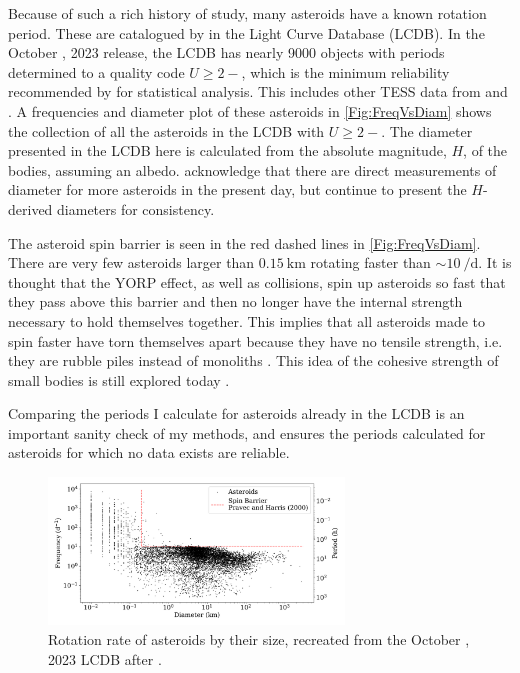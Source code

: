 \documentclass{UCreport}
\begin{document}
Because of such a rich history of study, many asteroids have a known rotation period.
These are catalogued by \citet{Warner2009} in the Light Curve Database (LCDB).
In the October , 2023 release, the LCDB has nearly 9000 objects with periods determined to a quality code $U\geq 2-$, which is the minimum reliability recommended by \citeauthor{Warner2009} for statistical analysis.
This includes other TESS data from \citet{Pal2020} and \citet{Woods2021}.
A frequencies and diameter plot of these asteroids in \autoref{Fig:FreqVsDiam} shows the collection of all the asteroids in the LCDB with $U\geq 2-$.
The diameter presented in the LCDB here is calculated from the absolute magnitude, $H$, of the bodies, assuming an albedo.
\citeauthor{Warner2009} acknowledge that there are direct measurements of diameter for more asteroids in the present day, but continue to present the $H$-derived diameters for consistency.

The asteroid spin barrier \citep{Pravec2000} is seen in the red dashed lines in \autoref{Fig:FreqVsDiam}.
There are very few asteroids larger than $\qty{0.15}{\kilo\metre}$ rotating faster than $\sim \qty{10}{\per\day}$.
It is thought that the YORP effect, as well as collisions, spin up asteroids so fast that they pass above this barrier and then no longer have the internal strength necessary to hold themselves together.
This implies that all asteroids made to spin faster have torn themselves apart because they have no tensile strength, i.e. they are rubble piles instead of monoliths \citep{Harris1996}.
This idea of the cohesive strength of small bodies is still explored today \citep[e.g.][for V-type asteroids]{Oszkiewicz2020}.

Comparing the periods I calculate for asteroids already in the LCDB is an important sanity check of my methods, and ensures the periods calculated for asteroids for which no data exists are reliable.

\begin{figure}[h]
  \centering
  \includegraphics[width=0.7\textwidth]{./Figures/Diam-FreqPlot.pdf}
  \caption[Asteroid frequencies against diameter (LCDB)]{
    Rotation rate of asteroids by their size, recreated from the  October , 2023 LCDB after \citet{Warner2009}.
  }
  \label{Fig:FreqVsDiam}
\end{figure}
\end{document}
